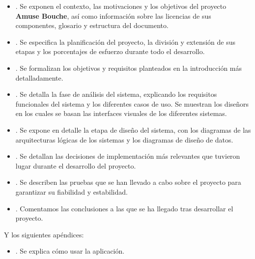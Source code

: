 \begin{itemize}
\item \textbf{}. Se exponen el contexto, las
  motivaciones y los objetivos del proyecto \textbf{Amuse Bouche}, así como
  información sobre las licencias de sus componentes, glosario y estructura del
  documento.

\item \textbf{}. Se especifica la planificación del
  proyecto, la división y extensión de sus etapas y los porcentajes de esfuerzo
  durante todo el desarrollo.

\item \textbf{}. Se formalizan los objetivos y
  requisitos planteados en la introducción más detalladamente.

\item \textbf{}. Se detalla la fase de análisis del
  sistema, explicando los requisitos funcionales del sistema y los diferentes
  casos de uso. Se muestran los diseñors en los cuales se basan las interfaces
  visuales de los diferentes sistemas.

\item \textbf{}. Se expone en detalle la etapa de diseño
  del sistema, con los diagramas de las arquitecturas lógicas de los sistemas y
  los diagramas de diseño de datos.

\item \textbf{}. Se detallan las decisiones de
  implementación más relevantes que tuvieron lugar durante el desarrollo del
  proyecto.

\item \textbf{}. Se describen las pruebas que se han
  llevado a cabo sobre el proyecto para garantizar su fiabilidad y estabilidad.

\item \textbf{}. Comentamos las conclusiones a las
  que se ha llegado tras desarrollar el proyecto.
\end{itemize}

Y los siguientes apéndices:
\begin{itemize}
\item \textbf{}. Se explica cómo usar la aplicación.
\end{itemize}
